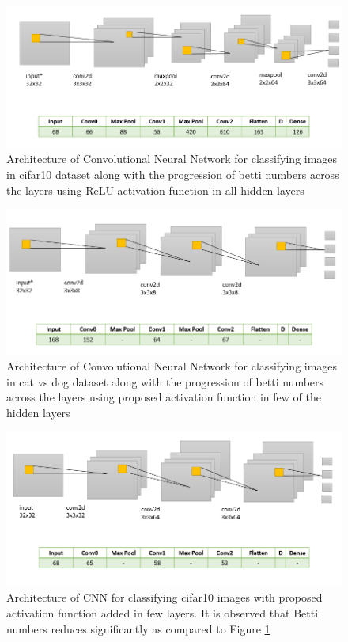 \documentclass{bmvc2k}
\begin{document}
\begin{figure}
    \centering
    \includegraphics[width=.7\linewidth]{images/cnn_result_1_paper.PNG}
    \caption{Architecture of Convolutional Neural Network for classifying images in cifar10 dataset along with the progression of betti numbers across the layers using ReLU activation function in all hidden layers}
    \label{figure9}
    \end{figure}

\begin{figure}
    \centering
    \includegraphics[width=.7\linewidth]{images/cnn result 3 paper.PNG}
    \caption{Architecture of Convolutional Neural Network for classifying images in cat vs dog dataset along with the progression of betti numbers across the layers using proposed activation function in few of the hidden layers}
    \label{figure10}
    \end{figure}

\begin{figure}
    \centering
    \includegraphics[width=.7\linewidth]{images/cnn result 2 paper.PNG}
    \caption{Architecture of CNN for classifying cifar10 images with proposed activation function added in few layers. It is observed that Betti numbers reduces significantly as compared to Figure \ref{figure9}  }
    \label{figure25}
    \end{figure}
\end{document}
